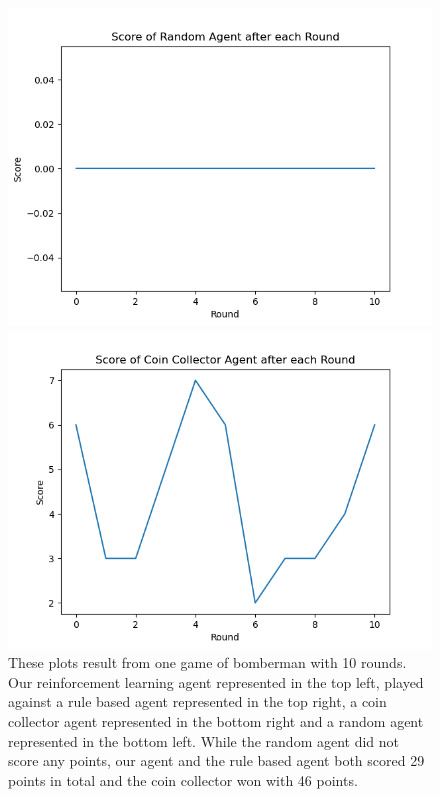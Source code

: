 \begin{figure}[H]
\begin{minipage}{0.49\textwidth}
	\end{minipage}
	\begin{minipage}{0.49\textwidth}
		\centering
		\includegraphics[scale=0.52]{images/random_scores11_1.png}
	\end{minipage}
	\begin{minipage}{0.49\textwidth}
		\centering
		\includegraphics[scale=0.52]{images/coin_scores11_1.png}
	\end{minipage}
	\caption{These plots result from one game of bomberman with 10 rounds. Our reinforcement learning agent represented in the top left, played against a rule based agent represented in the top right, a coin collector agent represented in the bottom right and a random agent represented in the bottom left. While the random agent did not score any points, our agent and the rule based agent both scored 29 points in total and the coin collector won with 46 points.}
	\label{fig:game1}
\end{figure}

